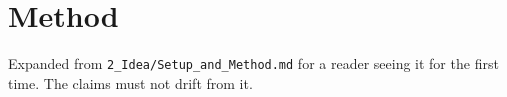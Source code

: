 \section{Method}
\label{sec:method}

Expanded from \texttt{2\_Idea/Setup\_and\_Method.md} for a reader seeing it for the first
time. The claims must not drift from it.
